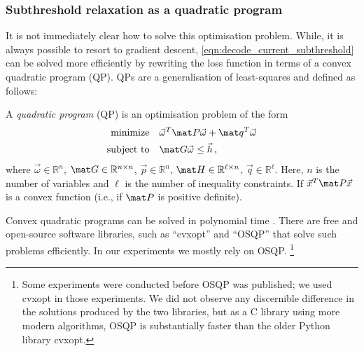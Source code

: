 \subsubsection{Subthreshold relaxation as a quadratic program}
It is not immediately clear how to solve this optimisation problem.
While, it is always possible to resort to gradient descent, \cref{eqn:decode_current_subthreshold} can be solved more efficiently by rewriting the loss function in terms of a convex quadratic program (QP).
QPs are a generalisation of least-squares and defined as follows:
\begin{definition}
\label{def:qp}
A \emph{quadratic program} (QP) is an optimisation problem of the form \citep[slightly simplified from][Section~4.4]{boyd2004convex}
\begin{align*}
	\text{minimize} &\quad
		\vec \omega^T \mat P \vec \omega + \mat q^T \vec \omega \\
	\text{subject to} &\quad
		\mat G \vec \omega \leq \vec h \,,
\end{align*}
where $\vec \omega \in \mathbb{R}^{n}$, $\mat G \in \mathbb{R}^{n \times n}$, $\vec p \in \mathbb{R}^{n}$, $\mat H \in \mathbb{R}^{\ell \times n}$, $\vec q \in \mathbb{R}^{\ell}$.
Here, $n$ is the number of variables and $\ell$ is the number of inequality constraints.
If $\vec x^T \mat P \vec x$ is a convex function (i.e., if $\mat P$ is positive definite).
\end{definition}

Convex quadratic programs can be solved in polynomial time \citep{kozlov1980polynomial}.
There are free and open-source software libraries, such as \enquote{cvxopt} \citep{vandenberghe2010cvxopt} and \enquote{OSQP}  \citep{stellato2020osqp} that solve such problems efficiently.
In our experiments we mostly rely on OSQP.%
\footnote{Some experiments were conducted before OSQP was published; we used cvxopt in those experiments. We did not observe any discernible difference in the solutions produced by the two libraries, but as a C library using more modern algorithms, OSQP is substantially faster than the older Python library cvxopt.}

